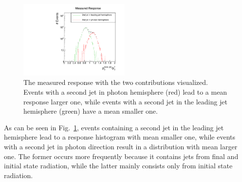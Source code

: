 \begin{figure}[!b]
  \centering
  \vspace{35pt}
      \includegraphics[width=0.49\textwidth]{figures/resolution/methodology/fullResponseAndContributionsExample.pdf}
  \caption{The measured response with the two contributions visualized. Events with a second jet in photon hemisphere (red) lead to a mean response larger one, while events with a
           second jet in the leading jet hemisphere (green) have a mean smaller one.}  
  \label{fig:fullResponseAndContributions}
\end{figure}

As can be seen in Fig.~\ref{fig:fullResponseAndContributions}, events containing a second jet in the leading jet hemisphere lead to a response histogram with mean smaller one, while events with a second jet in photon direction result in a distribution with mean larger one. 
The former occurs more frequently because it contains jets from final and initial state radiation, while the latter mainly consists only from initial state radiation.




